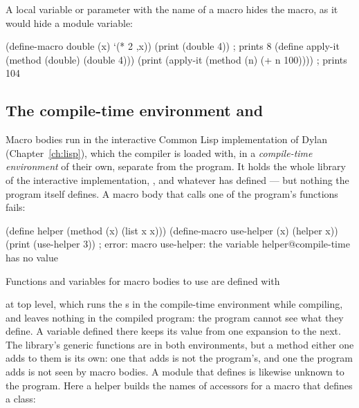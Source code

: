 A local variable or parameter with the name of a macro hides the macro,
as it would hide a module variable:

\begin{dylan}
(define-macro double (x) `(* 2 ,x))
(print (double 4))                              ; prints 8
(define apply-it (method (double) (double 4)))
(print (apply-it (method (n) (+ n 100))))       ; prints 104
\end{dylan}

\subsection{The compile-time environment and }
\label{sec:ext-compile-time}

Macro bodies run in the interactive Common Lisp implementation of Dylan
(Chapter~\ref{ch:lisp}), which the compiler is loaded with, in a
\emph{compile-time environment} of their own, separate from the program.
It holds the whole library of the interactive implementation,
, and whatever  has defined ---
but nothing the program itself defines. A macro body that calls one of
the program's functions fails:

\begin{dylan}
(define helper (method (x) (list x x)))
(define-macro use-helper (x) (helper x))
(print (use-helper 3))
; error: macro use-helper: the variable helper@compile-time has no value
\end{dylan}

Functions and variables for macro bodies to use are defined with

\begin{quote}
\end{quote}

\noindent at top level, which runs the s in the compile-time
environment while compiling, and leaves nothing in the compiled program:
the program cannot see what they define. A variable defined there keeps
its value from one expansion to the next. The library's generic
functions are in both environments, but a method either one adds to them
is its own: one that  adds is not the program's,
and one the program adds is not seen by macro bodies. A module that
 defines is likewise unknown to the program.
Here a helper builds the names of accessors for a macro that defines a
class:

